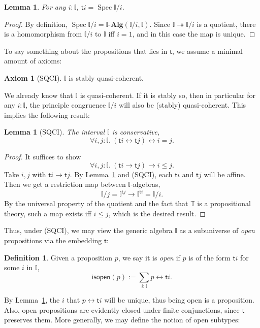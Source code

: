 \documentclass[12pt]{amsart}
\newtheorem{lemma}[theorem]{Lemma}
\theoremstyle{definition}
\newtheorem{definition}[theorem]{Definition}
\newtheorem{axiom}{Axiom}
\newcommand{\mb}[1]{\mathbf{#1}}
\newcommand{\mbb}[1]{\mathbb{#1}}
\newcommand{\T}{\mbb T}
\newcommand{\I}{\mbb I}
\newcommand{\ms}[1]{\mathsf{#1}}
\newcommand{\alg}{\text{-}\mb{Alg}}
\newcommand{\surj}{\twoheadrightarrow}
\newcommand{\fa}[2]{\forall #1\!\colon\!\!#2.\ }
\newcommand{\eq}{\leftrightarrow}
\newcommand{\spec}{\operatorname{Spec}}
\begin{document}
\begin{lemma}\label{lem:openpropaffine}
  For any $i : \I$, $\ms ti = \spec \I/i$.
\end{lemma}
\begin{proof}
  By definition, $\spec \I/i = \I\alg(\I/i,\I)$. Since $\I \surj \I/i$ is a quotient, there is a homomorphism from $\I/i$ to $\I$ iff $i = 1$, and in this case the map is unique.
\end{proof}

To say something about the propositions that lies in $\ms t$, we assume a minimal amount of axioms:

\begin{axiom}[SQCI]
  $\I$ is stably quasi-coherent.
\end{axiom}

We already know that $\I$ is quasi-coherent. If it is stably so, then in particular for any $i : \I$, the principle congruence $\I/i$ will also be (stably) quasi-coherent. This implies the following result:

\begin{lemma}[SQCI]\label{lem:intconserve}
  The interval $\I$ is conservative,
  \[ \fa{i,j}{\I} (\ms ti \eq \ms tj) \eq i = j. \]
\end{lemma}
\begin{proof}
  It suffices to show
  \[ \fa{i,j}{\I}(\ms ti \to \ms tj) \to i \le j. \]
  Take $i,j$ with $\ms ti \to \ms tj$. By Lemma~\ref{lem:openpropaffine} and (SQCI), each $\ms ti$ and $\ms tj$ will be affine. Then we get a restriction map between $\I$-algebras,
  \[ \I/j = \I^{\ms tj} \to \I^{\ms ti} = \I/i. \]
  By the universal property of the quotient and the fact that $\T$ is a propositional theory, such a map exists iff $i \le j$, which is the desired result.
\end{proof}

Thus, under (SQCI), we may view the generic algebra $\I$ as a subuniverse of \emph{open} propositions via the embedding $\ms t$:

\begin{definition}
  Given a proposition $p$, we say it is \emph{open} if $p$ is of the form $\ms ti$ for some $i$ in $\I$,
  \[ \ms{isopen}(p) := \sum_{i:\I}p \eq \ms ti. \]
\end{definition}

By Lemma~\ref{lem:intconserve}, the $i$ that $p \eq \ms ti$ will be unique, thus being open is a proposition. Also, open propositions are evidently closed under finite conjunctions, since $\ms t$ preserves them. More generally, we may define the notion of open subtypes:
\end{document}
